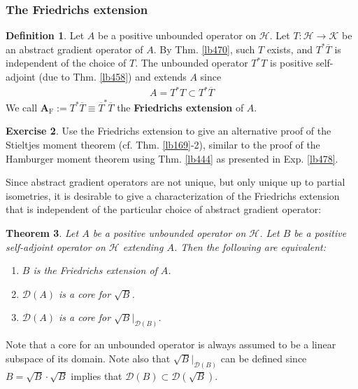 \documentclass[12pt,b5paper,notitlepage]{article}
\theoremstyle{definition}
\newtheorem{df}{Definition}[subsection]
\newtheorem{exe}[df]{Exercise}
\theoremstyle{plain}
\newtheorem{thm}[df]{Theorem}
\newcommand{\ovl}{\overline}
\newcommand{\Dom}{\mathscr{D}}
\newcommand{\MH}{\mathcal H}
\newcommand{\MK}{\mathcal K}
\newcommand{\Frm}{{\mathrm F}}
\numberwithin{equation}{section}
\begin{document}
\subsubsection{The Friedrichs extension}



\begin{df}\label{lb476}
Let $A$ be a positive unbounded operator on $\MH$. Let $T:\MH\rightarrow\MK$ be an abstract gradient operator of $A$. By Thm. \ref{lb470}, such $T$ exists, and $T^*\ovl T$ is independent of the choice of $T$. The unbounded operator $T^*T$ is positive self-adjoint (due to Thm. \ref{lb458}) and extends $A$ since
\begin{align*}
A=T^*T\subset T^*\ovl T
\end{align*}
We call $\pmb{A_\Frm}:=T^*\ovl T\equiv \ovl T^*\ovl T$ the \textbf{Friedrichs extension} of $A$. 
\end{df}


\begin{exe}
Use the Friedrichs extension to give an alternative proof of the Stieltjes moment theorem (cf. Thm. \ref{lb169}-2), similar to the proof of the Hamburger moment theorem using Thm. \ref{lb444} as presented in Exp. \ref{lb478}.
\end{exe}


Since abstract gradient operators are not unique, but only unique up to partial isometries, it is desirable to give a characterization of the Friedrichs extension that is independent of the particular choice of abstract gradient operator:

\begin{thm}\label{lb473}
Let $A$ be a positive unbounded operator on $\MH$. Let $B$ be a positive self-adjoint operator on $\MH$ extending $A$. Then the following are equivalent:
\begin{enumerate}[label=(\arabic*)]
\item $B$ is the Friedrichs extension of $A$.
\item $\Dom(A)$ is a core for $\sqrt B$.
\item $\Dom(A)$ is a core for $\sqrt B\big|_{\Dom(B)}$.
\end{enumerate}
\end{thm}

Note that a core for an unbounded operator is always assumed to be a linear subspace of its domain. Note also that $\sqrt B\big|_{\Dom(B)}$ can be defined since $B=\sqrt B\cdot\sqrt B$ implies that $\Dom(B)\subset\Dom(\sqrt B)$.
\end{document}
